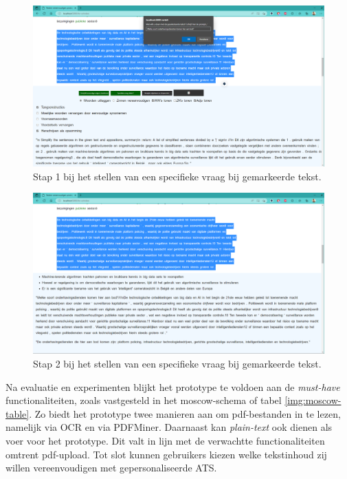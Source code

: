 \begin{center}
	\begin{figure}[H]
		\includegraphics[width=\linewidth]{img/proto-vraagstelling-1.png}
		\caption{Stap 1 bij het stellen van een specifieke vraag bij gemarkeerde tekst.}
		\label{img:step-1-proto-vraagstelling}
	\end{figure}
\end{center}

\begin{center}
	\begin{figure}[H]
		\includegraphics[width=\linewidth]{img/proto-vraagstelling-2.png}
		\caption{Stap 2 bij het stellen van een specifieke vraag bij gemarkeerde tekst.}
		\label{img:step-2-proto-vraagstelling}
	\end{figure}
\end{center}

Na evaluatie en experimenten blijkt het prototype te voldoen aan de \textit{must-have} functionaliteiten, zoals vastgesteld in het moscow-schema of tabel \ref{img:moscow-table}. Zo biedt het prototype twee manieren aan om pdf-bestanden in te lezen, namelijk via OCR en via PDFMiner. Daarnaast kan \textit{plain-text} ook dienen als voer voor het prototype. Dit valt in lijn met de verwachtte functionaliteiten omtrent pdf-upload. Tot slot kunnen gebruikers kiezen welke tekstinhoud zij willen vereenvoudigen met gepersonaliseerde ATS.

